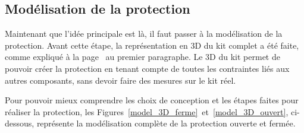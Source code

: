 \subsection{Modélisation de la protection}
Maintenant que l'idée principale est là, il faut passer à la modélisation de la protection. Avant cette étape, la représentation en 3D du kit complet a été faite, comme expliqué à la page~\pageref{modelisation_3D} au premier paragraphe. Le 3D du kit permet de pouvoir créer la protection en tenant compte de  toutes les contraintes liés aux autres composants, sans devoir faire des mesures sur le kit réel.

Pour pouvoir mieux comprendre les choix de conception et les étapes faites pour réaliser la protection, les Figures~\ref{model_3D_ferme}~et~\ref{model_3D_ouvert}, ci-dessous, représente la modélisation complète de la protection ouverte et fermée.

